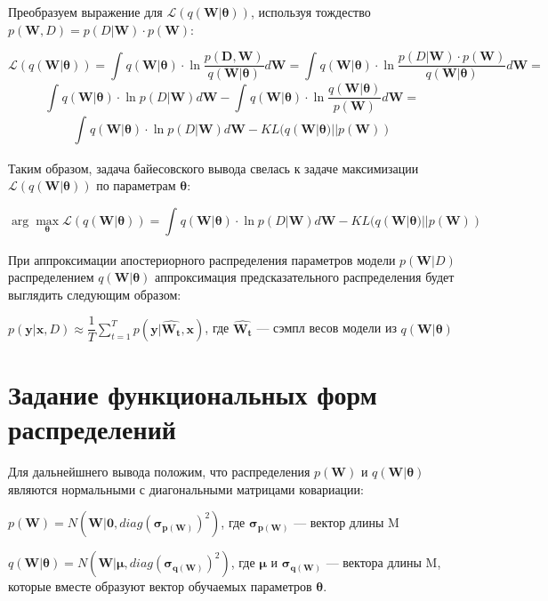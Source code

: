 \documentclass{article}
\newcommand{\argmax}{\arg\!\max}
\begin{document}
Преобразуем выражение для $\mathcal{L}(q(\mathbf{W} | \pmb{\theta}))$, используя тождество
$p(\mathbf{W}, D) = p(D | \mathbf{W}) \cdot p(\mathbf{W})$:

\[
\mathcal{L}(q(\mathbf{W} | \pmb{\theta})) =
\int_{}{} q(\mathbf{W} | \pmb{\theta}) \cdot \ln{\dfrac{p(\mathbf{D}, \mathbf{W})}{q(\mathbf{W} | \pmb{\theta})}} d\mathbf{W} =
\int_{}{} q(\mathbf{W} | \pmb{\theta}) \cdot \ln{\dfrac{p(D | \mathbf{W}) \cdot p(\mathbf{W})}{q(\mathbf{W} | \pmb{\theta})}} d\mathbf{W} =
\]\[
\int_{}{} q(\mathbf{W} | \pmb{\theta}) \cdot \ln{p(D | \mathbf{W})} d\mathbf{W} - \int_{}{} q(\mathbf{W} | \pmb{\theta}) \cdot \ln{\dfrac{q(\mathbf{W} | \pmb{\theta})}{p(\mathbf{W})}} d\mathbf{W} =
\]\[
\int_{}{} q(\mathbf{W} | \pmb{\theta}) \cdot \ln{p(D | \mathbf{W})} d\mathbf{W} - KL(q(\mathbf{W} | \pmb{\theta}) || p(\mathbf{W}))
\]

Таким образом, задача байесовского вывода свелась к задаче максимизации $\mathcal{L}(q(\mathbf{W} | \pmb{\theta}))$ по параметрам $\pmb{\theta}$:

\[
\argmax_{\pmb{\theta}} \mathcal{L}(q(\mathbf{W} | \pmb{\theta})) =
\int_{}{} q(\mathbf{W} | \pmb{\theta}) \cdot \ln{p(D | \mathbf{W})} d\mathbf{W} - KL(q(\mathbf{W} | \pmb{\theta}) || p(\mathbf{W}))
\]

При аппроксимации апостериорного распределения параметров модели $p(\mathbf{W}| D)$ распределением $q(\mathbf{W} | \pmb{\theta})$ аппроксимация предсказательного распределения будет выглядить следующим образом:

$
p(\mathbf{y} | \mathbf{x}, D)
\approx \dfrac{1}{T} \sum_{t=1}^{T}{p(\mathbf{y} | \hat{\mathbf{W_t}}, \mathbf{x})}
$, где $\hat{\mathbf{W_t}}$ --- сэмпл весов модели из $q(\mathbf{W} | \pmb{\theta})$

\section{Задание функциональных форм распределений}
Для дальнейшнего вывода положим, что распределения $p(\mathbf{W})$ и $q(\mathbf{W} | \pmb{\theta})$ являются нормальными с диагональными матрицами ковариации:

$
p(\mathbf{W}) =
N(\mathbf{W} | \mathbf{0}, diag(\pmb{\sigma_{p(\mathbf{W})}})^{2})$,
где $\pmb{\sigma_{p(\mathbf{W})}}$ — вектор длины M

$q(\mathbf{W} | \pmb{\theta}) = N(\mathbf{W} | \pmb{\mu}, diag(\pmb{\sigma_{q(\mathbf{W})}})^{2})$, где $\pmb{\mu}$ и $\pmb{\sigma_{q(\mathbf{W})}}$ — вектора длины M, которые вместе образуют вектор обучаемых параметров $\pmb{\theta}$.
\end{document}

